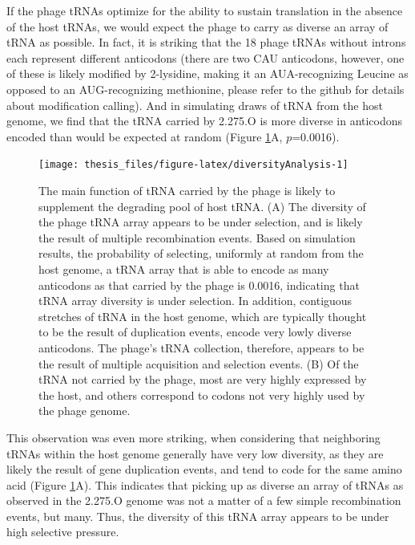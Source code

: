 \documentclass[12pt,twoside]{mitthesis-manusdown}
\begin{document}
If the phage tRNAs optimize for the ability to sustain translation in
the absence of the host tRNAs, we would expect the phage to carry as
diverse an array of tRNA as possible. In fact, it is striking that the
18 phage tRNAs without introns each represent different anticodons
(there are two CAU anticodons, however, one of these is likely modified
by 2-lysidine, making it an AUA-recognizing Leucine as opposed to an
AUG-recognizing methionine, please refer to the github for details about
modification calling). And in simulating draws of tRNA from the host
genome, we find that the tRNA carried by 2.275.O is more diverse in
anticodons encoded than would be expected at random (Figure
\ref{fig:diversityAnalysis}A, \(p\)=0.0016).
\begin{figure}[tb!]

{\centering \texttt{[image: thesis\_files/figure-latex/diversityAnalysis-1]} 

}

\caption{\label{fig:diversityAnalysis}The main function of tRNA carried by the phage is likely to supplement the degrading pool of host tRNA. (A) The diversity of the phage tRNA array appears to be under selection, and is likely the result of multiple recombination events. Based on simulation results, the probability of selecting, uniformly at random from the host genome, a tRNA array that is able to encode as many anticodons as that carried by the phage is 0.0016, indicating that tRNA array diversity is under selection. In addition, contiguous stretches of tRNA in the host genome, which are typically thought to be the result of duplication events, encode very lowly diverse anticodons. The phage’s tRNA collection, therefore, appears to be the result of multiple acquisition and selection events. (B) Of the tRNA not carried by the phage, most are very highly expressed by the host, and others correspond to codons not very highly used by the phage genome.}\label{fig:diversityAnalysis}
\end{figure}
This observation was even more striking, when considering that
neighboring tRNAs within the host genome generally have very low
diversity, as they are likely the result of gene duplication events, and
tend to code for the same amino acid (Figure
\ref{fig:diversityAnalysis}A). This indicates that picking up as diverse
an array of tRNAs as observed in the 2.275.O genome was not a matter of
a few simple recombination events, but many. Thus, the diversity of this
tRNA array appears to be under high selective pressure.
\end{document}
